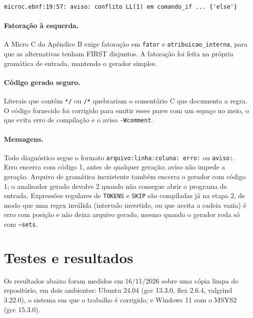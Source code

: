 \documentclass[11pt,a4paper]{article}
\begin{document}
\begin{lstlisting}
microc.ebnf:19:57: aviso: conflito LL(1) em comando_if ... {'else'}
\end{lstlisting}

\paragraph{Fatoração à esquerda.} A Micro C do Apêndice B exige fatoração em \texttt{fator} e
\texttt{atribuicao\_interna}, para que as alternativas tenham FIRST disjuntos. A fatoração foi
feita na própria gramática de entrada, mantendo o gerador simples.

\paragraph{Código gerado seguro.} Literais que contêm \texttt{*/} ou \texttt{/*} quebrariam o
comentário C que documenta a regra. O código fornecido foi corrigido para emitir esses pares com
um espaço no meio, o que evita erro de compilação e o aviso \texttt{-Wcomment}.

\paragraph{Mensagens.} Todo diagnóstico segue o formato \texttt{arquivo:linha:coluna: erro:} ou
\texttt{aviso:}. Erro encerra com código 1, antes de qualquer geração; aviso não impede a
geração. Arquivo de gramática inexistente também encerra o gerador com código 1; o analisador
gerado devolve 2 quando não consegue abrir o programa de entrada. Expressões regulares de
\texttt{TOKENS} e \texttt{SKIP} são compiladas já na etapa 2, de modo que uma regex inválida
(intervalo invertido, ou que aceita a cadeia vazia) é erro com posição e não deixa arquivo
gerado, mesmo quando o gerador roda só com \texttt{--sets}.

\section{Testes e resultados}

Os resultados abaixo foram medidos em 16/11/2026 sobre uma cópia limpa do repositório, em dois
ambientes: Ubuntu 24.04 (gcc 13.3.0, flex 2.6.4, valgrind 3.22.0), o sistema em que o trabalho é
corrigido, e Windows 11 com o MSYS2 (gcc 15.3.0).
\end{document}
